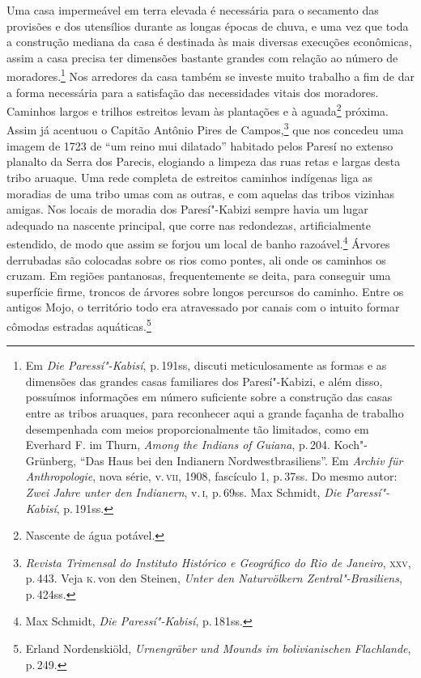 Uma casa impermeável em terra elevada é necessária para o secamento das
provisões e dos utensílios durante as longas épocas de chuva, e uma vez
que toda a construção mediana da casa é destinada às mais diversas
execuções econômicas, assim a casa precisa ter dimensões bastante
grandes com relação ao número de moradores.\footnote{Em \textit{Die Paressí"-Kabisí}, p.\,191ss, discuti meticulosamente as formas e as dimensões das grandes casas familiares dos Paresí"-Kabizi, e além disso, possuímos informações em número suficiente sobre a construção das casas entre as tribos aruaques, para reconhecer aqui a grande façanha de trabalho desempenhada com meios proporcionalmente tão limitados, como em Everhard F. im Thurn, \textit{Among the Indians of Guiana}, p.\,204. Koch"-Grünberg, ``Das Haus bei den Indianern Nordwestbrasiliens''. Em \textit{Archiv für Anthropologie}, nova série, v.\,\textsc{vii}, 1908, fascículo 1, p.\,37ss. Do mesmo autor: \textit{Zwei Jahre unter den Indianern}, v.\,\textsc{i}, p.\,69ss. Max Schmidt, \textit{Die Paressí"-Kabisí}, p.\,191ss.} Nos arredores da casa também
se investe muito trabalho a fim de dar a forma necessária para a
satisfação das necessidades vitais dos moradores. Caminhos largos e
trilhos estreitos levam às plantações e à aguada\footnote{Nascente de água potável.} próxima. Assim já
acentuou o Capitão Antônio Pires de Campos,\footnote{\textit{Revista
  Trimensal do Instituto Histórico e Geográfico do Rio de Janeiro}, \textsc{xxv},
  p.\,443. Veja \textsc{k}.\,von den Steinen, \textit{Unter den Naturvölkern
  Zentral"-Brasiliens}, p.\,424ss.} que nos concedeu uma imagem de 1723
de ``um reino mui dilatado'' habitado pelos Paresí no extenso planalto
da Serra dos Parecis, elogiando a limpeza das ruas retas e largas desta
tribo aruaque. Uma rede completa de estreitos caminhos indígenas liga as
moradias de uma tribo umas com as outras, e com aquelas das tribos
vizinhas amigas. Nos locais de moradia dos Paresí"-Kabizi sempre havia um
lugar adequado na nascente principal, que corre nas redondezas,
artificialmente estendido, de modo que assim se forjou um local de banho
razoável.\footnote{Max Schmidt, \textit{Die Paressí"-Kabisí}, p.\,181ss.}
Árvores derrubadas são colocadas sobre os rios como pontes, ali onde os
caminhos os cruzam. Em regiões pantanosas, frequentemente se deita, para conseguir
uma superfície firme,
troncos de árvores sobre longos percursos do caminho. Entre os antigos Mojo, o território todo era
atravessado por canais com o intuito formar cômodas estradas aquáticas.\footnote{Erland
  Nordenskiöld, \textit{Urnengräber und Mounds im bolivianischen Flachlande}, p.\,249.}

